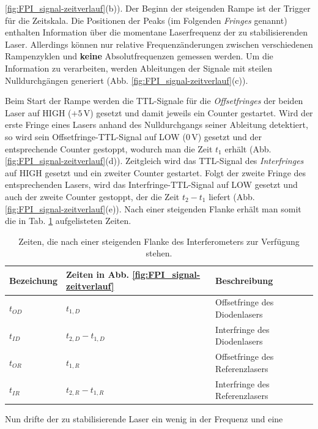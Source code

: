 \ref{fig:FPI_signal-zeitverlauf}(b)). Der Beginn der steigenden Rampe ist der
Trigger für die Zeitskala. Die Positionen der Peaks (im Folgenden
\textit{Fringes} genannt) enthalten Information über die momentane
Laserfrequenz der zu stabilisierenden Laser. Allerdings können nur relative
Frequenzänderungen zwischen verschiedenen Rampenzyklen und \textbf{keine}
Absolutfrequenzen gemessen werden. Um die Information zu verarbeiten, werden Ableitungen der Signale mit
steilen Nulldurchgängen generiert (Abb.
\ref{fig:FPI_signal-zeitverlauf}(c)).\par
Beim Start der Rampe werden die TTL-Signale für die \textit{Offsetfringes} der
beiden Laser auf HIGH ($+5\,$V) gesetzt und damit jeweils ein Counter gestartet.
Wird der erste Fringe eines Lasers anhand des Nulldurchgangs seiner Ableitung
detektiert, so wird sein Offsetfringe-TTL-Signal auf LOW ($0\,$V) gesetzt und der
entsprechende Counter gestoppt, wodurch man die Zeit $t_1$ erhält (Abb.
\ref{fig:FPI_signal-zeitverlauf}(d)). Zeitgleich wird das TTL-Signal des
\textit{Interfringes} auf HIGH gesetzt und ein zweiter Counter gestartet.
Folgt der zweite Fringe des entsprechenden Lasers, wird das
Interfringe-TTL-Signal auf LOW gesetzt und auch der zweite Counter gestoppt,
der die Zeit $t_2-t_1$ liefert (Abb. \ref{fig:FPI_signal-zeitverlauf}(e)). Nach
einer steigenden Flanke erhält man somit die in Tab. \ref{tab:laserzeiten}
aufgelisteten Zeiten.\par
\begin{table}
	\begin{tabular}{p{}p{}p{}}
		\toprule
		Bezeichung & Zeiten in Abb. \ref{fig:FPI_signal-zeitverlauf} & Beschreibung \\
		\midrule[1px]
		\hline
		$t_{OD}$ & $t_{1,D}$ & Offsetfringe des Diodenlasers \\
		$t_{ID}$ & $t_{2,D}-t_{1,D}$ & Interfringe des Diodenlasers \\
		$t_{OR}$ & $t_{1,R}$ & Offsetfringe des Referenzlasers \\
		$t_{IR}$ & $t_{2,R}-t_{1,R}$ & Interfringe des Referenzlasers \\
		\bottomrule[1px]
	\end{tabular}
	\caption[Fringezeiten]{Zeiten, die nach einer steigenden Flanke des
	Interferometers zur Verfügung stehen.}
	\label{tab:laserzeiten}
\end{table}
Nun drifte der zu stabilisierende Laser ein wenig in der Frequenz und eine
